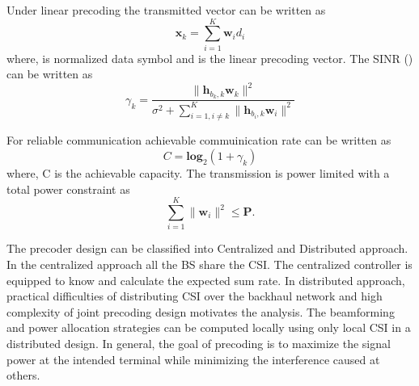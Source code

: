 Under linear precoding the transmitted vector  can be written as
\begin{equation}
\mathbf{x}_k = \sum^K_{i=1} \mathbf{w}_i d_i
\label{precoder2_eqn}
\end{equation}
where,  is normalized data symbol and  is the linear precoding vector. The \ac{SINR} () can be written as
\begin{equation}
\gamma_k = \frac{ \|\mathbf{h}_{b_k,k} \mathbf{w}_k\|^{2}}{\sigma^{2}+\sum_{i = 1, i \neq k}^{K} \|\mathbf{h}_{b_i,k} \mathbf{w}_{i}\|^{2}}
\label{precoder3_eqn}
\end{equation}

For reliable communication achievable commuinication rate can be written as
\begin{equation}
C = \mathbf{log}_2(1 + \gamma_k) 
\label{precoder4_eqn}
\end{equation}
where, C is the achievable capacity. The transmission is power limited with a total power constraint as
\begin{equation}
\sum_{i = 1}^{K} \|\mathbf{w}_i\|^2 \leq \mathbf{P}.
\label{precoder5_eqn}
\end{equation} 

The precoder design can be classified into Centralized and Distributed approach. In the centralized approach all the \ac{BS} share the \ac{CSI}. The centralized controller is equipped to know and calculate the expected sum rate. In distributed approach, practical difficulties of distributing \ac{CSI} over the backhaul network and high complexity of joint precoding design motivates the analysis. The beamforming and power allocation strategies can be computed locally using only local \ac{CSI} in a distributed design. In general, the goal of precoding is to maximize the signal power at the intended terminal while minimizing the interference caused at others. 